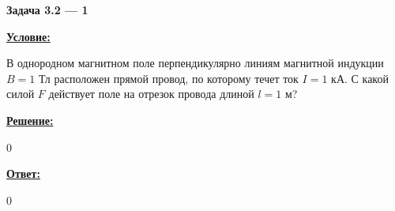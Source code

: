 
\begin{center}
    \textbf{Задача 3.2 --- 1}
\end{center}

\underline{\textbf{Условие:}}

В однородном магнитном поле перпендикулярно линиям магнитной индукции 
$ B = 1 $ Тл расположен прямой провод, по которому течет ток 
$ I = 1 $ кА. 
С какой силой $ F $ действует поле на отрезок провода длиной $ l = 1 $ м?

\underline{\textbf{Решение:}}

0

\underline{\textbf{Ответ:}}

0
